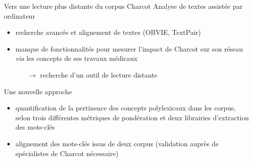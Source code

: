 \begin{frame}{Vers une lecture plus distante du corpus Charcot}
Analyse de textes assistée par ordinateur
    \begin{itemize}
        \item recherche avancée et alignement de textes (OBVIE, TextPair)
        \begingroup 
{}
\endgroup
        \item manque de fonctionnalités pour mesurer l’impact de Charcot sur son réseau \textit{via} les concepts de ses travaux médicaux 
        \begin{itemize}
        \item[$\rightarrow$] recherche d'un outil de \og{}lecture distante\fg{}
        \end{itemize}
    \end{itemize}
    \begin{block}{Une nouvelle approche}
        \begin{itemize}
    \item quantification de la pertinence des concepts polylexicaux dans les corpus, selon trois différentes métriques de pondération et deux librairies d'extraction des mots-clés
    \item alignement des mots-clés issus de deux corpus (validation auprès de
spécialistes de Charcot nécessaire)
\end{itemize}
    \end{block}
\end{frame}

